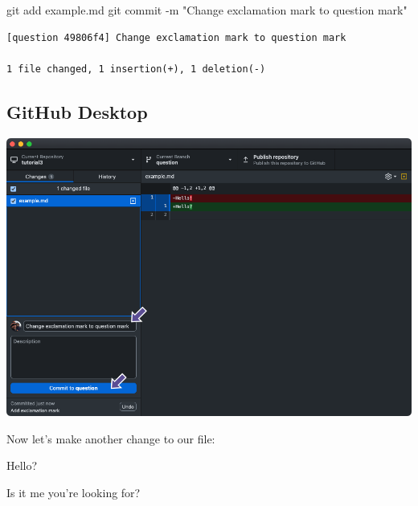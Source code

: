 \documentclass[
  letterpaper,
  DIV=11,
  numbers=noendperiod]{scrartcl}
\newenvironment{Shaded}{\begin{snugshade}}{\end{snugshade}}
\newcommand{\NormalTok}[1]{\textcolor[rgb]{0.00,0.23,0.31}{#1}}
\newcommand{\SpecialCharTok}[1]{\textcolor[rgb]{0.37,0.37,0.37}{#1}}
\newcommand{\StringTok}[1]{\textcolor[rgb]{0.13,0.47,0.30}{#1}}
\begin{document}
\begin{Shaded}
\begin{Highlighting}[]
\NormalTok{git add example.md}
\NormalTok{git commit }\SpecialCharTok{{-}}\NormalTok{m }\StringTok{"Change exclamation mark to question mark"}
\end{Highlighting}
\end{Shaded}

\begin{verbatim}
[question 49806f4] Change exclamation mark to question mark

1 file changed, 1 insertion(+), 1 deletion(-)
\end{verbatim}

\subsection{GitHub Desktop}

\includegraphics{images/image38.png}

Now let's make another change to our file:

\begin{tcolorbox}[enhanced jigsaw, toprule=.15mm, coltitle=black, opacitybacktitle=0.6, leftrule=.75mm, bottomrule=.15mm, colframe=quarto-callout-note-color-frame, titlerule=0mm, title=\textcolor{quarto-callout-note-color}{\faInfo}\hspace{0.5em}{example.md}, colback=white, breakable, opacityback=0, left=2mm, colbacktitle=quarto-callout-note-color!10!white, toptitle=1mm, bottomtitle=1mm, arc=.35mm, rightrule=.15mm]

Hello?

Is it me you're looking for?

\end{tcolorbox}
\end{document}
